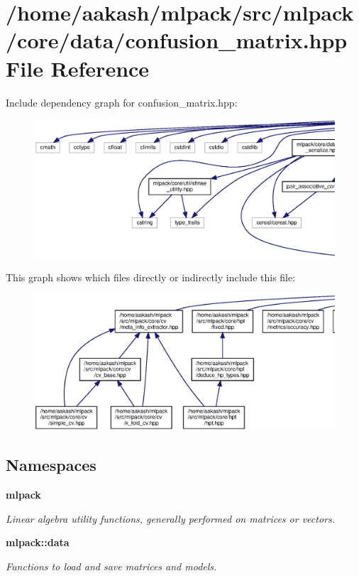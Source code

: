 \section{/home/aakash/mlpack/src/mlpack/core/data/confusion\+\_\+matrix.hpp File Reference}
\label{confusion__matrix_8hpp}
Include dependency graph for confusion\+\_\+matrix.\+hpp\+:
\nopagebreak
\begin{figure}[H]
\begin{center}
\leavevmode
\includegraphics[width=350pt]{confusion__matrix_8hpp__incl}
\end{center}
\end{figure}
This graph shows which files directly or indirectly include this file\+:
\nopagebreak
\begin{figure}[H]
\begin{center}
\leavevmode
\includegraphics[width=350pt]{confusion__matrix_8hpp__dep__incl}
\end{center}
\end{figure}
\subsection*{Namespaces}
\begin{DoxyCompactItemize}
\item 
 \textbf{ mlpack}
\begin{DoxyCompactList}\small\item\em Linear algebra utility functions, generally performed on matrices or vectors. \end{DoxyCompactList}\item 
 \textbf{ mlpack\+::data}
\begin{DoxyCompactList}\small\item\em Functions to load and save matrices and models. \end{DoxyCompactList}\end{DoxyCompactItemize}
